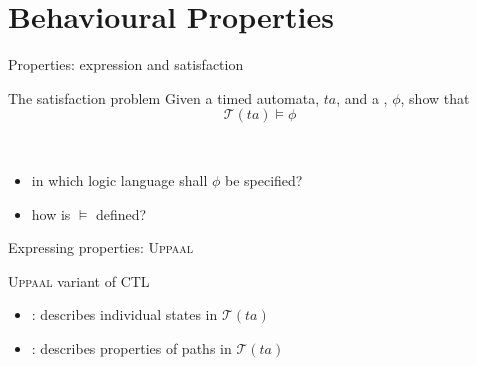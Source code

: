 \documentclass[aspectratio=169]{beamer}
\def\TL#1{\mathcal{T}(#1)}
\begin{document}
%
%
%
%
%







\section{Behavioural Properties}
\begin{slide}{Properties: expression and satisfaction}
\small
\begin{block}{The satisfaction problem }
Given a \alert{timed automata}, $ta$, and a , $\phi$, show that
\begin{equation*}
\TL{ta} \models \phi
\end{equation*}
\end{block}
~\\

\pause
\begin{itemize}
\item in which logic language shall $\phi$ be specified?
\item how is $\models$ defined?
\end{itemize}
\end{slide}




\begin{slide}{Expressing properties: \textsc{Uppaal}}
\small

\begin{block}{\textsc{Uppaal} variant of \textsc{CTL}}
\begin{itemize}
\item {}:  describes individual states in $\TL{ta}$
\item {}: describes properties of paths in $\TL{ta}$
\end{itemize}
\end{block}

\end{slide}
\end{document}
